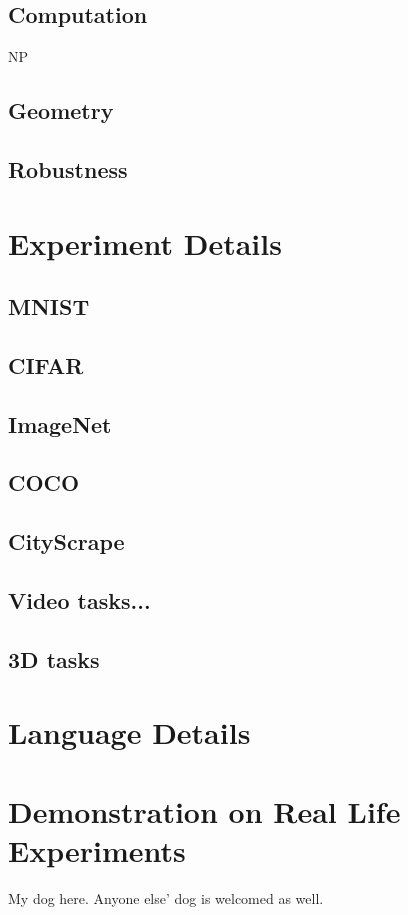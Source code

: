 \documentclass[10pt, oneside]{article}   	%
\theoremstyle{definition}
\begin{document}
\subsection{Computation}

NP
\subsection{Geometry}

\subsection{Robustness}


\clearpage
{}
\section{Experiment Details}
\subsection{MNIST}
\subsection{CIFAR}
\subsection{ImageNet}
\subsection{COCO}
\subsection{CityScrape}
\subsection{Video tasks...}
\subsection{3D tasks}
\section{Language Details}
\section{Demonstration on Real Life Experiments}

My dog here. Anyone else' dog is welcomed as well.
\end{document}
